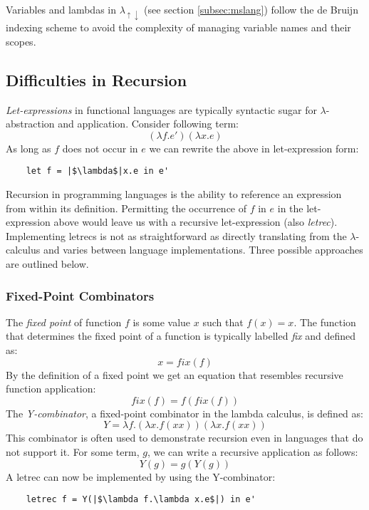 \documentclass[a4paper,12pt,twoside,openright]{report}
\theoremstyle{definition}
\newcommand{\mslang}{$\lambda_{\uparrow\downarrow}$}
\begin{document}
Variables and lambdas in \mslang{} (see section \ref{subsec:mslang}) follow the de Bruijn indexing scheme to avoid the complexity of managing variable names and their scopes.

\subsection{Difficulties in Recursion}\label{subsec:recursion}
\textit{Let-expressions} in functional languages are typically syntactic sugar for $\lambda$-abstraction and application. Consider following term:
\begin{equation*}
    (\lambda f.e')(\lambda x.e)
\end{equation*}
As long as $f$ does not occur in $e$ we can rewrite the above in let-expression form:
\begin{verbatim}
    let f = |$\lambda$|x.e in e'
\end{verbatim}

Recursion in programming languages is the ability to reference an expression from within its definition. Permitting the occurrence of $f$ in $e$ in the let-expression above would leave us with a recursive let-expression (also \textit{letrec}). Implementing letrecs is not as straightforward as directly translating from the $\lambda$-calculus and varies between language implementations. Three possible approaches are outlined below.

\subsubsection{Fixed-Point Combinators}
The \textit{fixed point} of function $f$ is some value $x$ such that $f(x)=x$. The function that determines the fixed point of a function is typically labelled \textit{fix} and defined as:
\begin{equation*}
    x = \mathit{fix}(f)
\end{equation*}
By the definition of a fixed point we get an equation that resembles recursive function application:
\begin{equation*}
    \mathit{fix}(f) = f (\mathit{fix}(f))
\end{equation*}
The \textit{Y-combinator}, a fixed-point combinator in the lambda calculus, is defined as:
\begin{equation*}
    Y=\lambda f.(\lambda x.f(x x)) (\lambda x.f(x x))
\end{equation*}
This combinator is often used to demonstrate recursion even in languages that do not support it. For some term, $g$, we can write a recursive application as follows:
\begin{equation*}
    Y(g) = g(Y(g))
\end{equation*}
A letrec can now be implemented by using the Y-combinator:
\begin{verbatim}
    letrec f = Y(|$\lambda f.\lambda x.e$|) in e'
\end{verbatim}
\end{document}
